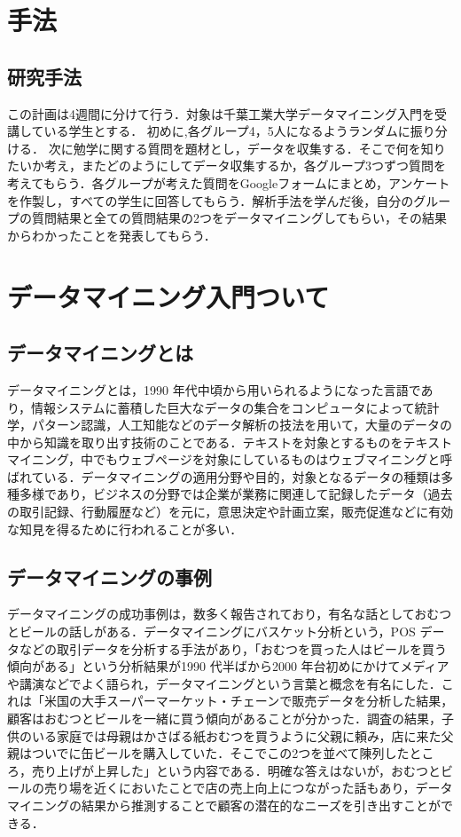 \chapter{手法}

\section{研究手法}

この計画は4週間に分けて行う．対象は千葉工業大学データマイニング入門を受講している学生とする．
初めに,各グループ4，5人になるようランダムに振り分ける．
次に勉学に関する質問を題材とし，データを収集する．そこで何を知りたいか考え，またどのようにしてデータ収集するか，各グループ3つずつ質問を考えてもらう．各グループが考えた質問をGoogleフォームにまとめ，アンケートを作製し，すべての学生に回答してもらう．解析手法を学んだ後，自分のグループの質問結果と全ての質問結果の2つをデータマイニングしてもらい，その結果からわかったことを発表してもらう．

\chapter{データマイニング入門ついて}

\section{データマイニングとは}

データマイニングとは，1990 年代中頃から用いられるようになった言語であり，情報システムに蓄積した巨大なデータの集合をコンピュータによって統計学，パターン認識，人工知能などのデータ解析の技法を用いて，大量のデータの中から知識を取り出す技術のことである．テキストを対象とするものをテキストマイニング，中でもウェブページを対象にしているものはウェブマイニングと呼ばれている．データマイニングの適用分野や目的，対象となるデータの種類は多種多様であり，ビジネスの分野では企業が業務に関連して記録したデータ（過去の取引記録、行動履歴など）を元に，意思決定や計画立案，販売促進などに有効な知見を得るために行われることが多い．


\section{データマイニングの事例}
データマイニングの成功事例は，数多く報告されており，有名な話としておむつとビールの話しがある．データマイニングにバスケット分析という，POS データなどの取引データを分析する手法があり，「おむつを買った人はビールを買う傾向がある」という分析結果が1990 代半ばから2000 年台初めにかけてメディアや講演などでよく語られ，データマイニングという言葉と概念を有名にした．これは「米国の大手スーパーマーケット・チェーンで販売データを分析した結果，顧客はおむつとビールを一緒に買う傾向があることが分かった．調査の結果，子供のいる家庭では母親はかさばる紙おむつを買うように父親に頼み，店に来た父親はついでに缶ビールを購入していた．そこでこの2つを並べて陳列したところ，売り上げが上昇した」という内容である．明確な答えはないが，おむつとビールの売り場を近くにおいたことで店の売上向上につながった話もあり，データマイニングの結果から推測することで顧客の潜在的なニーズを引き出すことができる．

